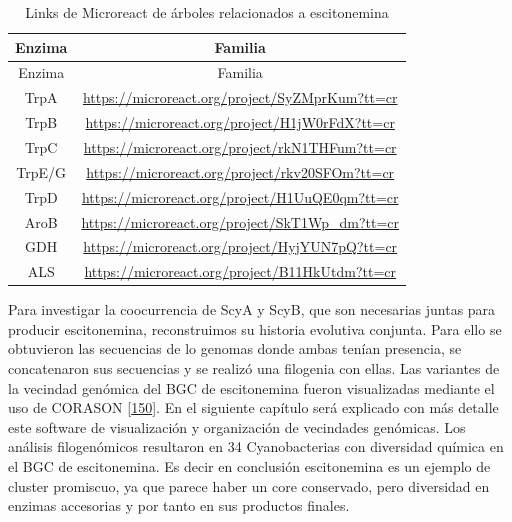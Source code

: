 \documentclass[12pt,twoside]{reedthesis}
\begin{document}
  \begin{longtable}[]{@{}cc@{}}
  \caption{Links de Microreact de árboles relacionados a escitonemina
  \label{tab:Microreact}}\tabularnewline
  \toprule
  Enzima & Familia\tabularnewline
  \midrule
  \endfirsthead
  \toprule
  Enzima & Familia\tabularnewline
  \midrule
  \endhead
  TrpA &
  \url{https://microreact.org/project/SyZMprKum?tt=cr}\tabularnewline
  TrpB &
  \url{https://microreact.org/project/H1jW0rFdX?tt=cr}\tabularnewline
  TrpC &
  \url{https://microreact.org/project/rkN1THFum?tt=cr}\tabularnewline
  TrpE/G &
  \url{https://microreact.org/project/rkv20SFOm?tt=cr}\tabularnewline
  TrpD &
  \url{https://microreact.org/project/H1UuQE0qm?tt=cr}\tabularnewline
  AroB &
  \url{https://microreact.org/project/SkT1Wp_dm?tt=cr}\tabularnewline
  GDH &
  \url{https://microreact.org/project/HyjYUN7pQ?tt=cr}\tabularnewline
  ALS &
  \url{https://microreact.org/project/B11HkUtdm?tt=cr}\tabularnewline
  \bottomrule
  \end{longtable}
  
  Para investigar la coocurrencia de ScyA y ScyB, que son necesarias
  juntas para producir escitonemina, reconstruimos su historia evolutiva
  conjunta. Para ello se obtuvieron las secuencias de lo genomas donde
  ambas tenían presencia, se concatenaron sus secuencias y se realizó una
  filogenia con ellas. Las variantes de la vecindad genómica del BGC de
  escitonemina fueron visualizadas mediante el uso de CORASON
  {[}\protect\hyperlink{ref-navarro-munoz_computational_2018}{150}{]}. En
  el siguiente capítulo será explicado con más detalle este software de
  visualización y organización de vecindades genómicas. Los análisis
  filogenómicos resultaron en 34 Cyanobacterias con diversidad química en
  el BGC de escitonemina. Es decir en conclusión escitonemina es un
  ejemplo de cluster promiscuo, ya que parece haber un core conservado,
  pero diversidad en enzimas accesorias y por tanto en sus productos
  finales.
  
\end{document}
